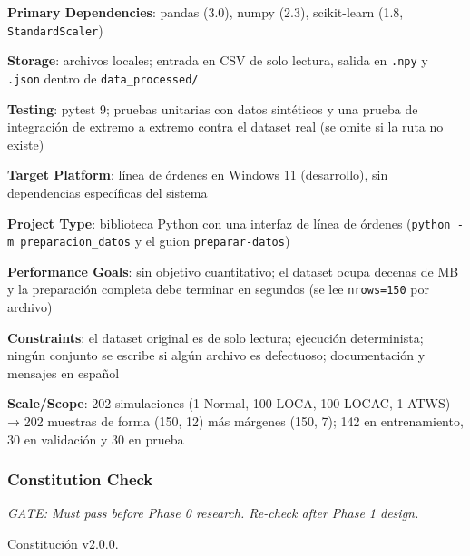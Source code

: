 \documentclass[12pt,a4paper]{article}
\newenvironment{documentogenerado}[2]{%
  \def\doccomando{#1}\def\docruta{#2}%
  \par\begingroup\small\setstretch{1.15}\sloppy%
}{\endgroup\par\medskip}
\begin{document}
\begin{documentogenerado}{/speckit-plan}{specs\slash 001-preparacion-datos\slash plan.md}
\textbf{Primary Dependencies}: pandas (3.0), numpy (2.3), scikit-learn (1.8, \texttt{StandardScaler})

\textbf{Storage}: archivos locales; entrada en CSV de solo lectura, salida en \texttt{.\allowbreak{}npy} y \texttt{.\allowbreak{}json} dentro de \texttt{data\_\allowbreak{}processed/}

\textbf{Testing}: pytest 9; pruebas unitarias con datos sintéticos y una prueba de integración de extremo a extremo contra el dataset real (se omite si la ruta no existe)

\textbf{Target Platform}: línea de órdenes en Windows 11 (desarrollo), sin dependencias específicas del sistema

\textbf{Project Type}: biblioteca Python con una interfaz de línea de órdenes (\texttt{python\ -\allowbreak{}m\ preparacion\_\allowbreak{}datos} y el guion \texttt{preparar-\allowbreak{}datos})

\textbf{Performance Goals}: sin objetivo cuantitativo; el dataset ocupa decenas de MB y la preparación completa debe terminar en segundos (se lee \texttt{nrows=\allowbreak{}150} por archivo)

\textbf{Constraints}: el dataset original es de solo lectura; ejecución determinista; ningún conjunto se escribe si algún archivo es defectuoso; documentación y mensajes en español

\textbf{Scale/\hspace{0pt}Scope}: 202 simulaciones (1 Normal, 100 LOCA, 100 LOCAC, 1 ATWS) → 202 muestras de forma (150, 12) más márgenes (150, 7); 142 en entrenamiento, 30 en validación y 30 en prueba

\subsubsection{Constitution Check}

\emph{GATE: Must pass before Phase 0 research. Re-check after Phase 1 design.}

Constitución v2.0.0.


\end{documentogenerado}
\end{document}
